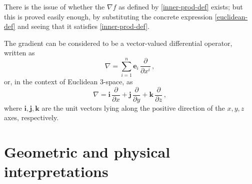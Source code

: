 \documentclass[12pt]{article}
\newcommand{\vi}{\mathbf{i}}
\newcommand{\vj}{\mathbf{j}}
\newcommand{\vk}{\mathbf{k}}
\newcommand{\ve}{\mathbf{e}}
\begin{document}
There is the issue of whether the $\nabla f$ as defined by \eqref{inner-prod-def}
exists; but this is proved easily enough, by substituting the concrete expression \eqref{euclidean-def}
and seeing that it satisfies \eqref{inner-prod-def}.

\medskip

The gradient can be considered to be a
vector-valued differential operator, written as
\[
\nabla = \sum_{i=1}^n \ve_i \, \frac{\partial}{\partial x^i}\,,
\]
or, in the context of Euclidean 3-space, as
\[
\nabla = \vi \, \frac{\partial}{\partial x} +\vj \,
\frac{\partial}{\partial y} +\vk \, \frac{\partial}{\partial z} \,,
\]
where
$\vi, \vj, \vk$ are the unit vectors lying along the positive
direction of the $x, y, z$ axes, respectively. 

\section{Geometric and physical interpretations}
\end{document}
